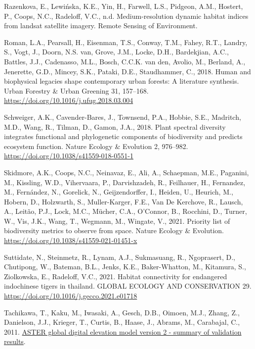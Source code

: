 \documentclass[
]{agujournal2019}
\newlength{\cslhangindent}
\newenvironment{CSLReferences}[2] %
 {\begin{list}{}{%
  \setlength{\itemindent}{0pt}
  \setlength{\leftmargin}{0pt}
  \setlength{\parsep}{0pt}
  \ifodd #1
   \setlength{\leftmargin}{\cslhangindent}
   \setlength{\itemindent}{-1\cslhangindent}
  \fi
  \setlength{\itemsep}{#2\baselineskip}}}
 {\end{list}}
\begin{document}
\begin{CSLReferences}{1}{0}
Razenkova, E., Lewińska, K.E., Yin, H., Farwell, L.S., Pidgeon, A.M.,
Hostert, P., Coops, N.C., Radeloff, V.C., n.d. Medium-resolution dynamic
habitat indices from landsat satellite imagery. Remote Sensing of
Environment.

Roman, L.A., Pearsall, H., Eisenman, T.S., Conway, T.M., Fahey, R.T.,
Landry, S., Vogt, J., Doorn, N.S. van, Grove, J.M., Locke, D.H.,
Bardekjian, A.C., Battles, J.J., Cadenasso, M.L., Bosch, C.C.K. van den,
Avolio, M., Berland, A., Jenerette, G.D., Mincey, S.K., Pataki, D.E.,
Staudhammer, C., 2018. Human and biophysical legacies shape contemporary
urban forests: A literature synthesis. Urban Forestry \& Urban Greening
31, 157--168. \url{https://doi.org/10.1016/j.ufug.2018.03.004}

Schweiger, A.K., Cavender-Bares, J., Townsend, P.A., Hobbie, S.E.,
Madritch, M.D., Wang, R., Tilman, D., Gamon, J.A., 2018. Plant spectral
diversity integrates functional and phylogenetic components of
biodiversity and predicts ecosystem function. Nature Ecology \&
Evolution 2, 976--982. \url{https://doi.org/10.1038/s41559-018-0551-1}

Skidmore, A.K., Coops, N.C., Neinavaz, E., Ali, A., Schaepman, M.E.,
Paganini, M., Kissling, W.D., Vihervaara, P., Darvishzadeh, R.,
Feilhauer, H., Fernandez, M., Fernández, N., Gorelick, N.,
Geijzendorffer, I., Heiden, U., Heurich, M., Hobern, D., Holzwarth, S.,
Muller-Karger, F.E., Van De Kerchove, R., Lausch, A., Leitão, P.J.,
Lock, M.C., Mücher, C.A., O'Connor, B., Rocchini, D., Turner, W., Vis,
J.K., Wang, T., Wegmann, M., Wingate, V., 2021. Priority list of
biodiversity metrics to observe from space. Nature Ecology \& Evolution.
\url{https://doi.org/10.1038/s41559-021-01451-x}

Suttidate, N., Steinmetz, R., Lynam, A.J., Sukmasuang, R., Ngoprasert,
D., Chutipong, W., Bateman, B.L., Jenks, K.E., Baker-Whatton, M.,
Kitamura, S., Ziolkowska, E., Radeloff, V.C., 2021. Habitat connectivity
for endangered indochinese tigers in thailand. GLOBAL ECOLOGY AND
CONSERVATION 29. \url{https://doi.org/10.1016/j.gecco.2021.e01718}

Tachikawa, T., Kaku, M., Iwasaki, A., Gesch, D.B., Oimoen, M.J., Zhang,
Z., Danielson, J.J., Krieger, T., Curtis, B., Haase, J., Abrams, M.,
Carabajal, C., 2011.
\href{http://pubs.er.usgs.gov/publication/70005960}{ASTER global digital
elevation model version 2 - summary of validation results}.


\end{CSLReferences}
\end{document}
